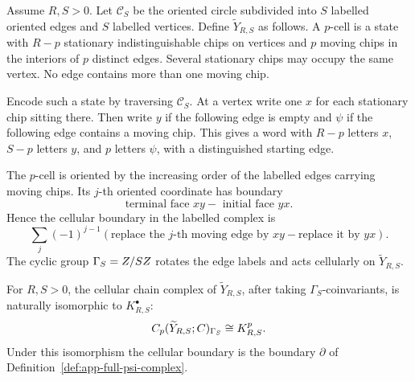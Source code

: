 \begin{constr}
\label{constr:app-chip-state-complex}
  Assume \(R,S>0\).  Let \(\mathscr C_S\) be the oriented circle subdivided
  into \(S\) labelled oriented edges and \(S\) labelled vertices.  Define
  \(\widetilde Y_{R,S}\) as follows.  A \(p\)-cell is a state with
  \(R-p\) stationary indistinguishable chips on vertices and \(p\) moving
  chips in the interiors of \(p\) distinct edges.  Several stationary chips
  may occupy the same vertex.  No edge contains more than one moving chip.

  Encode such a state by traversing \(\mathscr C_S\).  At a vertex write one
  \(x\) for each stationary chip sitting there.  Then write \(y\) if the
  following edge is empty and \(\psi\) if the following edge contains a
  moving chip.  This gives a word with \(R-p\) letters \(x\), \(S-p\) letters
  \(y\), and \(p\) letters \(\psi\), with a distinguished starting edge.

  The \(p\)-cell is oriented by the increasing order of the labelled edges
  carrying moving chips.  Its \(j\)-th oriented coordinate has boundary
  \[
    \text{terminal face }xy-\text{ initial face }yx.
  \]
  Hence the cellular boundary in the labelled complex is
  \[
    \sum_j(-1)^{j-1}(\text{replace the \(j\)-th moving edge by \(xy\)}
      -\text{replace it by \(yx\)}).
  \]
  The cyclic group \(\Gamma_S=Z/SZ\) rotates the edge labels and acts
  cellularly on \(\widetilde Y_{R,S}\).
\end{constr}

\begin{lem}
\label{lem:app-state-chain-identification}
  For \(R,S>0\), the cellular chain complex of
  \(\widetilde Y_{R,S}\), after taking \(\Gamma_S\)-coinvariants, is naturally
  isomorphic to \(K^\bullet_{R,S}\):
  \[
    C_p(\widetilde Y_{R,S};C)_{\Gamma_S}\cong K^p_{R,S}.
  \]
  Under this isomorphism the cellular boundary is the boundary
  \(\partial\) of Definition~\ref{def:app-full-psi-complex}.
\end{lem}

